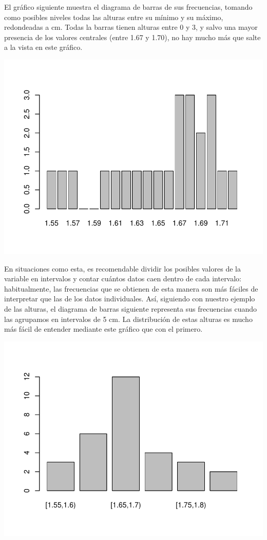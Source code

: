 \documentclass[
]{book}
\theoremstyle{definition}
\theoremstyle{definition}
\theoremstyle{definition}
\theoremstyle{remark}
\begin{document}
El gráfico siguiente muestra el diagrama de barras de sus frecuencias, tomando como posibles niveles todas las alturas entre su mínimo y su máximo, redondeadas a cm. Todas la barras tienen alturas entre 0 y 3, y salvo una mayor presencia de los valores centrales (entre 1.67 y 1.70), no hay mucho más que salte a la vista en este gráfico.

\begin{center}\includegraphics[width=0.6\linewidth]{13chap13_Agrupados_files/figure-latex/unnamed-chunk-2-1} \end{center}

En situaciones como esta, es recomendable dividir los posibles valores de la variable en intervalos y contar cuántos datos caen dentro de cada intervalo: habitualmente, las frecuencias que se obtienen de esta manera son más fáciles de interpretar que las de los datos individuales. Así, siguiendo con nuestro ejemplo de las alturas, el diagrama de barras siguiente representa sus frecuencias cuando las agrupamos en intervalos de 5 cm. La distribución de estas alturas es mucho más fácil de entender mediante este gráfico que con el primero.

\begin{center}\includegraphics[width=0.6\linewidth]{13chap13_Agrupados_files/figure-latex/unnamed-chunk-3-1} \end{center}
\end{document}
